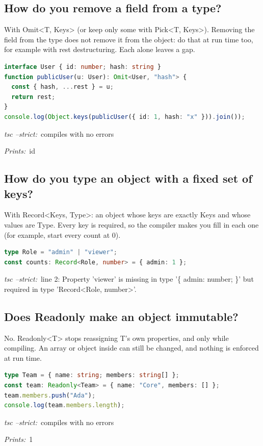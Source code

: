 \documentclass[10pt]{article}
\newcommand{\code}[1]{{\ttfamily\small #1}}
\begin{document}
\subsection{How do you remove a field from a type?}%
With \code{Omit<T, Keys>} (or keep only some with \code{Pick<T, Keys>}). Removing the field from the type does not remove it from the object: do that at run time too, for example with rest destructuring. Each alone leaves a gap.
\begin{lstlisting}[language=TypeScript]
interface User { id: number; hash: string }
function publicUser(u: User): Omit<User, "hash"> {
  const { hash, ...rest } = u;
  return rest;
}
console.log(Object.keys(publicUser({ id: 1, hash: "x" })).join());
\end{lstlisting}
{\small\textit{tsc --strict:}~compiles with no errors}\par
{\small\textit{Prints:}~\code{id}}\par

\subsection{How do you type an object with a fixed set of keys?}%
With \code{Record<Keys, Type>}: an object whose keys are exactly \code{Keys} and whose values are \code{Type}. Every key is required, so the compiler makes you fill in each one (for example, start every count at 0).
\begin{lstlisting}[language=TypeScript]
type Role = "admin" | "viewer";
const counts: Record<Role, number> = { admin: 1 };
\end{lstlisting}
{\small\textit{tsc --strict:}~line 2: Property 'viewer' is missing in type '\{ admin: number; \}' but required in type 'Record<Role, number>'.}\par

\subsection{Does Readonly make an object immutable?}%
No. \code{Readonly<T>} stops reassigning \code{T}'s own properties, and only while compiling. An array or object inside can still be changed, and nothing is enforced at run time.
\begin{lstlisting}[language=TypeScript]
type Team = { name: string; members: string[] };
const team: Readonly<Team> = { name: "Core", members: [] };
team.members.push("Ada");
console.log(team.members.length);
\end{lstlisting}
{\small\textit{tsc --strict:}~compiles with no errors}\par
{\small\textit{Prints:}~\code{1}}\par
\end{document}
